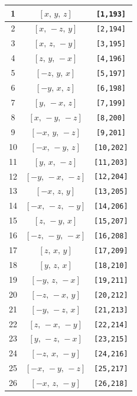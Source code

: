 \documentclass[fleqn,8pt]{jsarticle}
\begin{document}
\begin{longtable}{ccc}
1 & $\left[ x,\, y,\, z \right]$ & {\tt [1,193]} \\ \hline
2 & $\left[ x,\, - z,\, y \right]$ & {\tt [2,194]} \\ \hline
3 & $\left[ x,\, z,\, - y \right]$ & {\tt [3,195]} \\ \hline
4 & $\left[ z,\, y,\, - x \right]$ & {\tt [4,196]} \\ \hline
5 & $\left[ - z,\, y,\, x \right]$ & {\tt [5,197]} \\ \hline
6 & $\left[ - y,\, x,\, z \right]$ & {\tt [6,198]} \\ \hline
7 & $\left[ y,\, - x,\, z \right]$ & {\tt [7,199]} \\ \hline
8 & $\left[ x,\, - y,\, - z \right]$ & {\tt [8,200]} \\ \hline
9 & $\left[ - x,\, y,\, - z \right]$ & {\tt [9,201]} \\ \hline
10 & $\left[ - x,\, - y,\, z \right]$ & {\tt [10,202]} \\ \hline
11 & $\left[ y,\, x,\, - z \right]$ & {\tt [11,203]} \\ \hline
12 & $\left[ - y,\, - x,\, - z \right]$ & {\tt [12,204]} \\ \hline
13 & $\left[ - x,\, z,\, y \right]$ & {\tt [13,205]} \\ \hline
14 & $\left[ - x,\, - z,\, - y \right]$ & {\tt [14,206]} \\ \hline
15 & $\left[ z,\, - y,\, x \right]$ & {\tt [15,207]} \\ \hline
16 & $\left[ - z,\, - y,\, - x \right]$ & {\tt [16,208]} \\ \hline
17 & $\left[ z,\, x,\, y \right]$ & {\tt [17,209]} \\ \hline
18 & $\left[ y,\, z,\, x \right]$ & {\tt [18,210]} \\ \hline
19 & $\left[ - y,\, z,\, - x \right]$ & {\tt [19,211]} \\ \hline
20 & $\left[ - z,\, - x,\, y \right]$ & {\tt [20,212]} \\ \hline
21 & $\left[ - y,\, - z,\, x \right]$ & {\tt [21,213]} \\ \hline
22 & $\left[ z,\, - x,\, - y \right]$ & {\tt [22,214]} \\ \hline
23 & $\left[ y,\, - z,\, - x \right]$ & {\tt [23,215]} \\ \hline
24 & $\left[ - z,\, x,\, - y \right]$ & {\tt [24,216]} \\ \hline
25 & $\left[ - x,\, - y,\, - z \right]$ & {\tt [25,217]} \\ \hline
26 & $\left[ - x,\, z,\, - y \right]$ & {\tt [26,218]} \\ \hline

\end{longtable}
\end{document}
